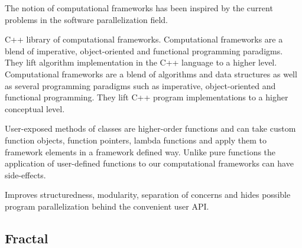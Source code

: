 The notion of computational frameworks has been inspired by the current problems in the software parallelization field. 

C++ library of computational frameworks. Computational frameworks are a blend of imperative, object-oriented and functional programming paradigms. They lift algorithm implementation in the C++ language to a higher level.
Computational frameworks are a blend of algorithms and data structures as well as several programming paradigms such as imperative, object-oriented and functional programming. They lift C++ program implementations to a higher conceptual level. 

User-exposed methods of classes are higher-order functions and can take custom function objects, function pointers, lambda functions and apply them to framework elements in a framework defined way. Unlike pure functions the application of user-defined functions to our computational frameworks can have side-effects.

\quad Improves structuredness, modularity, separation of concerns and hides possible program parallelization behind the convenient user API.  

\subsection{Fractal}
\label{frameworks_fractal}
